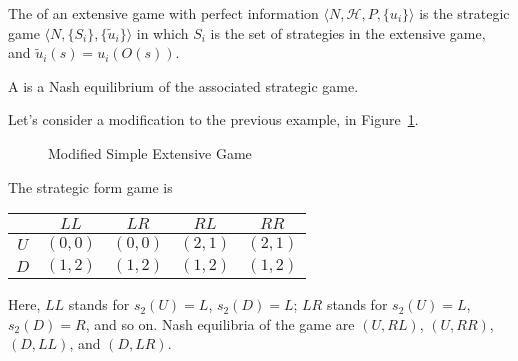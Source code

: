 \documentclass[10pt]{article}
\begin{document}
\begin{definition}
	The  of an extensive game with perfect information $\langle N,\mathcal{H},P,\{u_i\}\rangle$ is the strategic game $\langle N,\{S_i\},\{\tilde{u}_i\}\rangle$ in which $S_i$ is the set of strategies in the extensive game, and $\tilde{u}_i(s) = u_i(O(s))$.
	
	A  is a Nash equilibrium of the associated strategic game.
\end{definition}


\begin{example}
	 Let's consider a modification to the previous example, in Figure~\ref{fig:modified_extensive_game_simple}.
	\begin{figure}[H]
		\centering
		\caption{Modified Simple Extensive Game}
		\label{fig:modified_extensive_game_simple}
	\end{figure}
	
	The strategic form game is
	\begin{center}
		\begin{tabular}{c|cccc}
			& $LL$ & $LR$ & $RL$ & $RR$ \\\hline
			$U$ & $(0,0)$ & $(0,0)$ & $(2,1)$ & $(2,1)$ \\
			$D$ & $(1,2)$ & $(1,2)$ & $(1,2)$ & $(1,2)$ 
		\end{tabular}
		
	\end{center}
	Here, $LL$ stands for $s_2(U) = L$, $s_2(D) = L$; $LR$ stands for $s_2(U) = L$, $s_2(D) = R$, and so on. Nash equilibria of the game are $(U,RL)$, $(U,RR)$, $(D,LL)$, and $(D,LR)$.
\end{example}
\end{document}
